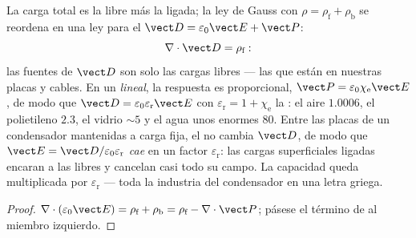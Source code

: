 \begin{proposition}\label{prop:b3:electromagnetism-in-matter:displacement}
La carga total es la libre más la ligada; la ley de Gauss con $\rho =
\rho_{\text{f}} + \rho_{\text{b}}$ se reordena en una ley para el
\emph{} $\vect D = \varepsilon_0\vect E +
\vect P$:
\[
\nabla\cdot\vect D = \rho_{\text{f}} :
\]
las fuentes de $\vect D$ son solo las cargas libres --- las que están en nuestras
placas y cables. En un  \emph{lineal}, la respuesta es
proporcional, $\vect P = \varepsilon_0\chi_{\text{e}}\vect E$, de modo que
$\vect D = \varepsilon_0\varepsilon_{\text{r}}\vect E$ con
$\varepsilon_{\text{r}} = 1 + \chi_{\text{e}}$ la \emph{}: el aire $1.0006$, el polietileno $2.3$, el vidrio $\sim 5$ y
el agua unos enormes $80$. Entre las placas de un condensador mantenidas a
carga fija, el  no cambia $\vect D$, de modo que $\vect E =
\vect D/\varepsilon_0\varepsilon_{\text{r}}$ \emph{cae} en un factor
$\varepsilon_{\text{r}}$: las cargas superficiales ligadas encaran a las
libres y cancelan casi todo su campo. La capacidad queda multiplicada por
$\varepsilon_{\text{r}}$ --- toda la industria del condensador en una
letra griega.
\end{proposition}

\begin{proof}
$\nabla\cdot(\varepsilon_0\vect E) = \rho_{\text{f}} +
\rho_{\text{b}} = \rho_{\text{f}} - \nabla\cdot\vect P$; pásese el
término de  al miembro izquierdo.
\end{proof}

